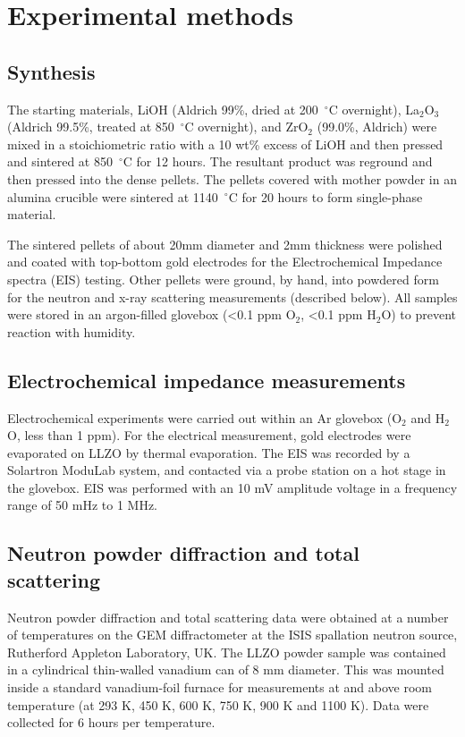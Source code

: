 \documentclass[twoside,twocolumn,9pt]{article}
\begin{document}
\section{Experimental methods}

\subsection{Synthesis}


The starting materials, LiOH (Aldrich 99\%, dried at 200~$^{\circ}$C overnight), La$_2$O$_3$ (Aldrich 99.5\%, treated at 850~$^{\circ}$C overnight), and ZrO$_2$ (99.0\%, Aldrich) were mixed in a stoichiometric ratio with a 10 wt\% excess of LiOH and then pressed and sintered at 850~$^{\circ}$C for 12 hours. The resultant product was reground and then pressed into the dense pellets. The pellets covered with mother powder in an alumina crucible were sintered at 1140~$^{\circ}$C for 20 hours to form single-phase material.

The sintered pellets of about 20mm diameter and 2mm thickness were polished and coated with top-bottom gold electrodes for the Electrochemical Impedance spectra (EIS) testing. Other pellets were ground, by hand, into powdered form for the neutron and x-ray scattering measurements (described below). All samples were stored in an argon-filled glovebox (<0.1 ppm O$_2$, <0.1 ppm H$_2$O) to prevent reaction with humidity.

\subsection{Electrochemical impedance measurements}

Electrochemical experiments were carried out within an Ar glovebox (O$_2$ and H$_2$O, less than 1 ppm). For the electrical measurement,
gold electrodes were evaporated on LLZO by thermal evaporation. The EIS was recorded by a Solartron ModuLab system,
and contacted via a probe station on a hot stage in the glovebox. EIS was performed with an 10 mV amplitude voltage in a frequency range of 50 mHz to 1 MHz.

\subsection{Neutron powder diffraction and total scattering}

Neutron powder diffraction and total scattering data were obtained at a number of temperatures on the GEM diffractometer \cite{Hannon:2005cy} at the
ISIS spallation neutron source, Rutherford Appleton Laboratory, UK. The LLZO powder sample was contained in a cylindrical thin-walled vanadium can of 8 mm diameter.
This was mounted inside a standard vanadium-foil furnace for measurements at and above room temperature (at 293 K, 450 K, 600 K, 750 K,
900 K and 1100 K). Data were collected for 6 hours per temperature.
\end{document}
